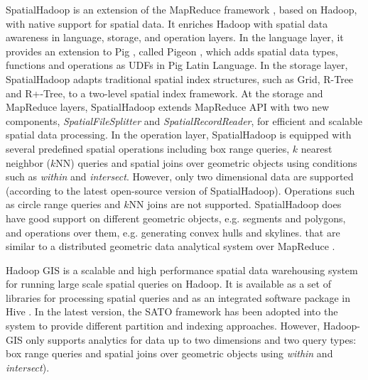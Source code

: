  SpatialHadoop \cite{spatialhadoop} is an
extension of the MapReduce framework \cite{mapr}, based on Hadoop,
with native support for spatial data. It enriches Hadoop with spatial
data awareness in language, storage, and operation layers. In the
language layer, it provides an extension to Pig \cite{pig}, called
Pigeon \cite{pigeon}, which adds spatial data types, functions and
operations as UDFs in Pig Latin Language. In the storage layer,
SpatialHadoop adapts traditional spatial index structures, such as
Grid, R-Tree and R+-Tree, to a two-level spatial index framework. At
the storage and MapReduce layers, SpatialHadoop extends MapReduce API
with two new components, \emph{SpatialFileSplitter} and
\emph{SpatialRecordReader}, for efficient and scalable spatial data
processing. In the operation layer, SpatialHadoop is equipped with
several predefined spatial operations including box range queries, $k$
nearest neighbor ($k$NN) queries and spatial joins over geometric
objects using conditions such as {\em within} and {\em
  intersect}. However, only two dimensional data are supported
(according to the latest open-source version of
SpatialHadoop). Operations such as circle range queries and $k$NN
joins are not supported.  SpatialHadoop does have good support on
different geometric objects, e.g. segments and polygons, and
operations over them, e.g. generating convex hulls and skylines. that
are similar to a distributed geometric data analytical system over
MapReduce \cite{cg_hadoop}.

Hadoop GIS \cite{hadoopgis} is a scalable and high performance spatial
data warehousing system for running large scale spatial queries on Hadoop.
It is available as a set of libraries for processing spatial queries
and as an integrated software package in Hive \cite{hive}. In the latest
version, the SATO framework \cite{sato} has been adopted into the system
to provide different partition and indexing approaches. However, Hadoop-GIS
only supports analytics for data up to two dimensions and two query types:
box range queries and spatial joins over geometric objects using {\em within}
and {\em intersect}). 

